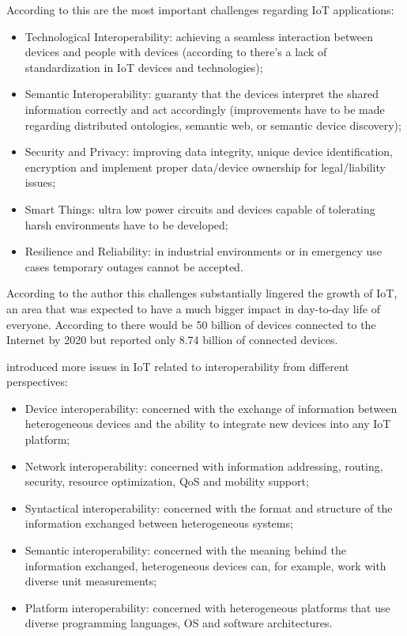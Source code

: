 According to \cite{7073822} this are the most important challenges regarding \gls{IoT} applications:

\begin{itemize}
    \item Technological Interoperability: achieving a seamless interaction between devices and people with devices (according to \cite{al2016iot} there's a lack of standardization in \gls{IoT} devices and technologies);
    \item Semantic Interoperability: guaranty that the devices interpret the shared information
correctly and act accordingly (improvements have to be made regarding distributed ontologies, semantic web, or semantic device discovery);
    \item Security and Privacy: improving data integrity, unique device identification, encryption and implement proper data/device ownership for legal/liability issues;
    \item Smart Things: ultra low power circuits and devices capable of tolerating harsh environments have to be developed;
    \item Resilience and Reliability: in industrial environments or in emergency use cases temporary outages cannot be accepted.
\end{itemize}

According to the author this challenges substantially lingered the growth of \gls{IoT}, an area that was expected to have a much bigger impact in day-to-day life of everyone. According to \cite{iot-cisco-prediction} there would be 50 billion of devices connected to the Internet by 2020 but \cite{statista-number-devices} reported only 8.74 billion of connected devices.

\cite{noura2019interoperability} introduced more issues in \gls{IoT} related to interoperability from different perspectives:

\begin{itemize}
    \item Device interoperability: concerned with the exchange of information between heterogeneous devices and the ability to integrate new devices into any \gls{IoT} platform;
    \item Network interoperability: concerned with information addressing, routing, security, resource optimization, \gls{QoS} and mobility support;
    \item Syntactical interoperability: concerned with the format and structure of the information exchanged between heterogeneous systems;
    \item Semantic interoperability: concerned with the meaning behind the information exchanged, heterogeneous devices can, for example, work with diverse unit measurements;
    \item Platform interoperability: concerned with heterogeneous platforms that use diverse programming languages, \gls{OS} and software architectures.
\end{itemize}


